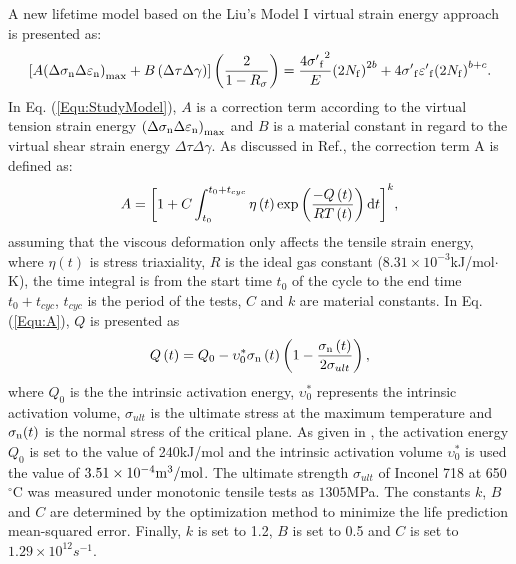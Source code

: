 A new lifetime model based on the Liu's Model I virtual strain energy approach is presented as:
\begin{equation}
\left[ {A{{\left( {\Delta {\sigma _{\rm n}}\Delta {\varepsilon _{\rm n}}} \right)}_{\max }} + B\left( {\Delta \tau \Delta \gamma } \right)} \right]\left( {\frac{2}{{1 - {R_\sigma }}}} \right)
= \frac{{4{{\sigma '}_{\rm f}}^2}}{E}{\left( {2{N_{\rm f}}} \right)^{2b}} + 4{{\sigma '}_{\rm f}}{{\varepsilon '}_{\rm f}}{\left( {2{N_{\rm f}}} \right)^{b + c}}.
\label{Equ:StudyModel}
\end{equation}
In Eq. (\ref{Equ:StudyModel}), $A$ is a correction term according to the virtual tension strain energy ${{\left( {\Delta {\sigma _{\rm n}}\Delta {\varepsilon _{\rm n}}} \right)}_{\max }}$ and $B$ is a material constant in regard to the virtual shear strain energy ${\Delta \tau \Delta \gamma }$.
As discussed in Ref.\cite{Vose2013}, the correction term A is defined as:
\begin{equation}
A = {\left[ {1 + C\int_{{t_0}}^{{t_0} + {t_{cyc}}} {\eta \left( t \right)\exp \left( {\frac{{ - Q\left( t \right)}}{{RT\left( t \right)}}} \right){\rm{d}}t} } \right]^k},
\label{Equ:A}
\end{equation}
assuming that the viscous deformation only affects the tensile strain energy, where $\eta \left( t \right)$ is stress triaxiality, $R$ is the ideal gas constant ($8.31\times10^{-3}$kJ/mol$\cdot$K), the time integral is from the start time $t_0$ of the cycle to the end time $t_0 + t_{cyc}$, $t_{cyc}$ is the period of the tests, $C$ and $k$ are material constants.
In Eq. (\ref{Equ:A}), $Q$ is presented \cite{Warren2006,Warren2008} as
\begin{equation}
Q\left( t \right) = {Q_0} - \upsilon _0^*{\sigma _{\rm n}}\left( t \right)\left( {1 - \frac{{{\sigma _{\rm n}}\left( t \right)}}{{2{\sigma _{ult}}}}} \right),
\label{Equ:creep_activation_energy}
\end{equation}
where $Q_0$ is the the intrinsic activation energy, $\upsilon _0^*$ represents the intrinsic activation volume, $\sigma_{ult}$ is the ultimate stress at the maximum temperature and $\sigma_{\rm n}(t)$ is the normal stress of the critical plane.
As given in \cite{Warren2008}, the activation energy $Q_0$ is set to the value of 240kJ/mol and the intrinsic activation volume $\upsilon _0^*$ is used the value of $3.51\times10^{-4}\rm{m}^{3}/\rm{mol}$. The ultimate strength $\sigma_{ult}$ of Inconel 718 at 650 $^\circ$C was measured under monotonic tensile tests as $1305$MPa. The constants $k$, $B$ and $C$ are determined by the optimization method to minimize the life prediction mean-squared error. Finally, $k$ is set to 1.2, $B$ is set to 0.5 and $C$ is set to $1.29\times10^{12}s^{-1}$.

